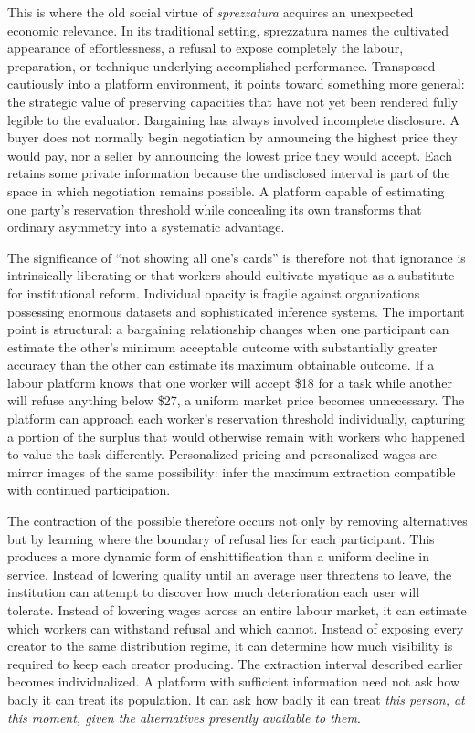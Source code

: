 \documentclass[11pt]{article}
\begin{document}
This is where the old social virtue of \emph{sprezzatura} \parencite{castiglione1528courtier} acquires an unexpected economic relevance. In its traditional setting, sprezzatura names the cultivated appearance of effortlessness, a refusal to expose completely the labour, preparation, or technique underlying accomplished performance. Transposed cautiously into a platform environment, it points toward something more general: the strategic value of preserving capacities that have not yet been rendered fully legible to the evaluator. Bargaining has always involved incomplete disclosure. A buyer does not normally begin negotiation by announcing the highest price they would pay, nor a seller by announcing the lowest price they would accept. Each retains some private information because the undisclosed interval is part of the space in which negotiation remains possible. A platform capable of estimating one party's reservation threshold while concealing its own transforms that ordinary asymmetry into a systematic advantage.

The significance of ``not showing all one's cards'' is therefore not that ignorance is intrinsically liberating or that workers should cultivate mystique as a substitute for institutional reform. Individual opacity is fragile against organizations possessing enormous datasets and sophisticated inference systems. The important point is structural: a bargaining relationship changes when one participant can estimate the other's minimum acceptable outcome with substantially greater accuracy than the other can estimate its maximum obtainable outcome. If a labour platform knows that one worker will accept \$18 for a task while another will refuse anything below \$27, a uniform market price becomes unnecessary. The platform can approach each worker's reservation threshold individually, capturing a portion of the surplus that would otherwise remain with workers who happened to value the task differently. Personalized pricing and personalized wages are mirror images of the same possibility: infer the maximum extraction compatible with continued participation.

The contraction of the possible therefore occurs not only by removing alternatives but by learning where the boundary of refusal lies for each participant. This produces a more dynamic form of enshittification than a uniform decline in service. Instead of lowering quality until an average user threatens to leave, the institution can attempt to discover how much deterioration each user will tolerate. Instead of lowering wages across an entire labour market, it can estimate which workers can withstand refusal and which cannot. Instead of exposing every creator to the same distribution regime, it can determine how much visibility is required to keep each creator producing. The extraction interval described earlier becomes individualized. A platform with sufficient information need not ask how badly it can treat its population. It can ask how badly it can treat \emph{this person, at this moment, given the alternatives presently available to them}.
\end{document}
